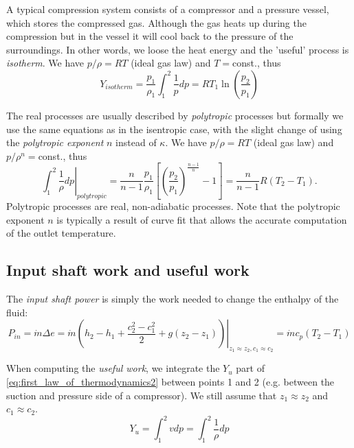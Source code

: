 A typical compression system consists of a compressor and a pressure vessel, which stores the compressed gas. Although the gas heats up during the compression but in the vessel it will cool back to the pressure of the surroundings. In other words, we loose the heat energy and the 'useful' process is \emph{isotherm}. We have $p/\rho=RT$ (ideal gas law) and $T=$const., thus
%
\begin{equation}
Y_{isotherm}=\frac{p_1}{\rho_1}\int_1^2\frac{1}{p}dp = R T_1 \ln\left( \frac{p_2}{p_1}\right)
\end{equation}

The real processes are usually described by \emph{polytropic} processes but formally we use the same equations as in the isentropic case, with the slight change of using the \emph{polytropic exponent} $n$ instead of $\kappa$. We have $p/\rho=RT$ (ideal gas law) and $p/\rho^n=$const., thus
%
\begin{equation}
\left.\int_1^2\frac{1}{\rho}dp\right|_{polytropic} = \frac{n}{n-1}\frac{p_1}{\rho_1} \left[\left(\frac{p_2}{p_1}\right)^{\frac{n-1}{n}}-1\right]=\frac{n}{n-1} R \left( T_2-T_1\right).
\label{eq:chap1_polytropic_specific_work}
\end{equation}
%
Polytropic processes are real, non-adiabatic processes. Note that the polytropic exponent $n$ is typically a result of curve fit that allows the accurate computation of the outlet temperature.

\subsection{Input shaft work and useful work}

The \emph{input shaft power} is simply the work needed to change the enthalpy of the fluid:
\begin{equation}
P_{in}=\dot{m} \Delta e = \left.\dot{m} \left( h_2-h_1 + \frac{c_2^2-c_1^2}{2} + g(z_2-z_1)\right)\right|_{z_1\approx z_2, c_1\approx c_2}=\dot{m} c_p \left(T_2-T_1\right)
\label{eq:shaftwork}
\end{equation}

When computing the \emph{useful work}, we integrate the $Y_u$ part of \eqref{eq:first_law_of_thermodynamics2} between points 1 and 2 (e.g. between the suction and pressure side of a compressor). We still assume that $z_1\approx z_2$ and $c_1 \approx c_2$.
\begin{equation}
Y_u = \int_1^2 v dp = \int_1^2 \frac{1}{\rho} dp
\end{equation}

